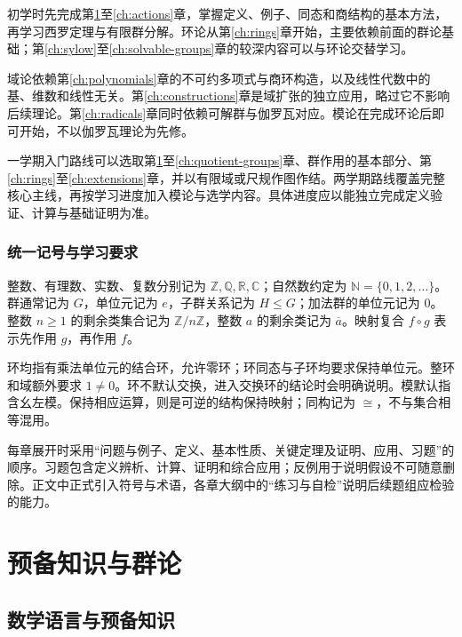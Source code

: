 \documentclass[UTF8,12pt,a4paper,fontset=fandol]{ctexbook}
\begin{document}
初学时先完成第\ref{ch:preliminaries}至\ref{ch:actions}章，掌握定义、例子、同态和商结构的基本方法，再学习西罗定理与有限群分解。环论从第\ref{ch:rings}章开始，主要依赖前面的群论基础；第\ref{ch:sylow}至\ref{ch:solvable-groups}章的较深内容可以与环论交替学习。

域论依赖第\ref{ch:polynomials}章的不可约多项式与商环构造，以及线性代数中的基、维数和线性无关。第\ref{ch:constructions}章是域扩张的独立应用，略过它不影响后续理论。第\ref{ch:radicals}章同时依赖可解群与伽罗瓦对应。模论在完成环论后即可开始，不以伽罗瓦理论为先修。

一学期入门路线可以选取第\ref{ch:preliminaries}至\ref{ch:quotient-groups}章、群作用的基本部分、第\ref{ch:rings}至\ref{ch:extensions}章，并以有限域或尺规作图作结。两学期路线覆盖完整核心主线，再按学习进度加入模论与选学内容。具体进度应以能独立完成定义验证、计算与基础证明为准。

\section{统一记号与学习要求}

整数、有理数、实数、复数分别记为 $\mathbb Z,\mathbb Q,\mathbb R,\mathbb C$；自然数约定为 $\mathbb N=\{0,1,2,\ldots\}$。群通常记为 $G$，单位元记为 $e$，子群关系记为 $H\leq G$；加法群的单位元记为 $0$。整数 $n\geq 1$ 的剩余类集合记为 $\mathbb Z/n\mathbb Z$，整数 $a$ 的剩余类记为 $\overline a$。映射复合 $f\circ g$ 表示先作用 $g$，再作用 $f$。

环均指有乘法单位元的结合环，允许零环；环同态与子环均要求保持单位元。整环和域额外要求 $1\ne0$。环不默认交换，进入交换环的结论时会明确说明。模默认指含幺左模。保持相应运算，则是可逆的结构保持映射；同构记为 $\cong$，不与集合相等混用。

每章展开时采用“问题与例子、定义、基本性质、关键定理及证明、应用、习题”的顺序。习题包含定义辨析、计算、证明和综合应用；反例用于说明假设不可随意删除。正文中正式引入符号与术语，各章大纲中的“练习与自检”说明后续题组应检验的能力。

\mainmatter
\part{预备知识与群论}

\chapter{数学语言与预备知识}\label{ch:preliminaries}
\end{document}
